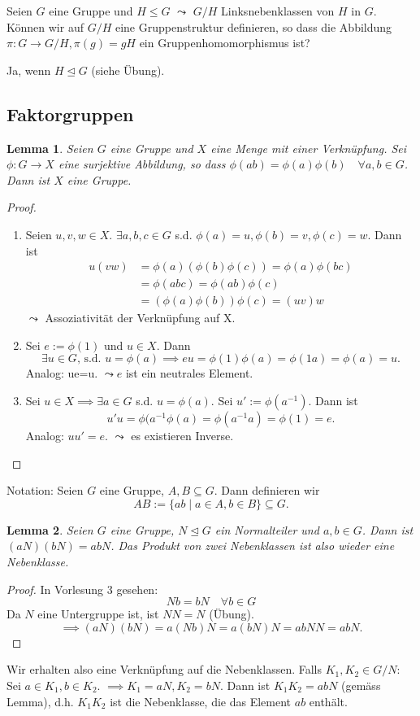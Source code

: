 \documentclass{article}
\theoremstyle{plain}
\newtheorem{lemma}{Lemma}
\newcommand{\ug}{\leq}
\newcommand{\normal}{\trianglelefteq}
\begin{document}
Seien $G$ eine Gruppe und $H\ug G$ $\leadsto$ $G/H$ Linksnebenklassen von $H$ in $G$.
Können wir auf $G/H$ eine Gruppenstruktur definieren, so dass die Abbildung $\pi\colon G\to G/H, \pi(g)=gH$ ein Gruppenhomomorphismus ist?

Ja, wenn $H\normal G$ (siehe Übung).

\subsection*{Faktorgruppen}
\begin{lemma}\label{lem:sur_gruppe}
    Seien $G$ eine Gruppe und $X$ eine Menge mit einer Verknüpfung.
    Sei $\phi\colon G\to X$ eine surjektive Abbildung, so dass $\phi(ab)=\phi(a)\phi(b)\quad \forall a,b\in G$. Dann ist $X$ eine Gruppe.
\end{lemma}
\begin{proof}
    \begin{enumerate}[label=(\roman*)]
        \item Seien $u,v,w\in X$. $\exists a,b,c \in G$ s.d. $\phi(a)=u, \phi(b)=v, \phi(c)=w$.
        Dann ist 
        \begin{align*}
            u(vw)&=\phi(a)(\phi(b)\phi(c))=\phi(a)\phi(bc)\\
            &=\phi(abc)=\phi(ab)\phi(c)\\
            &=(\phi(a)\phi(b))\phi(c) = (uv)w
        \end{align*} 
        $\leadsto$ Assoziativität der Verknüpfung auf X.
        \item Sei $e:=\phi(1)$ und $u\in X$. Dann $$\exists u\in G\text{, s.d. }u=\phi(a)\implies eu=\phi(1)\phi(a)=\phi(1a)=\phi(a)=u.$$ Analog: ue=u. $\leadsto e$ ist ein neutrales Element.
        \item Sei $u\in X \implies \exists a\in G$ s.d. $u=\phi(a)$. Sei $u':=\phi(a^{-1})$. Dann ist $$u'u=\phi(a^{-1}\phi(a)=\phi(a^{-1}a)=\phi(1)=e.$$ Analog: $uu'=e$. $\leadsto$ es existieren Inverse.
    \end{enumerate}
\end{proof}
Notation: Seien $G$ eine Gruppe, $A, B \subseteq G$.
Dann definieren wir $$AB := \{ab\mid a\in A, b\in B\} \subseteq G.$$

\begin{lemma}
    Seien $G$ eine Gruppe, $N\normal G$ ein Normalteiler und $a,b \in G$. Dann ist $(aN)(bN) = abN$.
    Das Produkt von zwei Nebenklassen ist also wieder eine Nebenklasse.
\end{lemma}
\begin{proof}
    In Vorlesung 3 gesehen: $$Nb=bN\quad\forall b\in G$$
    Da $N$ eine Untergruppe ist, ist $NN=N$ (Übung).
    $$\implies (aN)(bN) = a(Nb)N=a(bN)N=abNN=abN.$$
\end{proof}
Wir erhalten also eine Verknüpfung auf die Nebenklassen.
Falls $K_1, K_2\in G/N$: 
Sei $a\in K_1, b\in K_2$. 
$\implies K_1=aN, K_2=bN$.
Dann ist $K_1K_2=abN$ (gemäss Lemma), d.h. $K_1K_2$ ist die Nebenklasse, die das Element $ab$ enthält.
\end{document}
